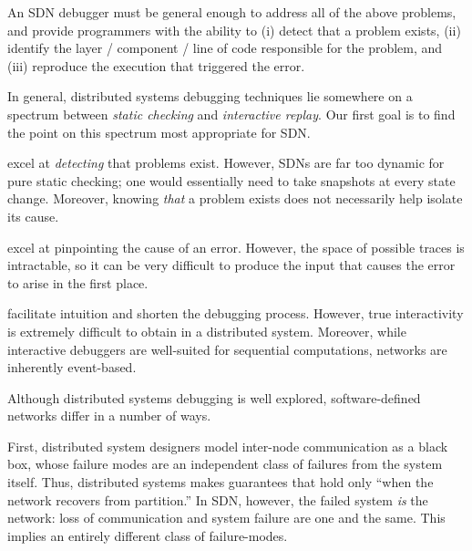 An SDN debugger must be general enough to address all of the above problems, and provide programmers
with the ability to (i) detect that a problem exists, (ii) identify the layer / component / line of code
responsible for the problem, and (iii) reproduce the execution that triggered the error.

In general, distributed systems debugging techniques lie somewhere on a spectrum between
{\it static checking} and {\it interactive replay}. Our first goal is to find
the point on this spectrum most appropriate for SDN. 

 \cite{anteater} excel at {\it detecting} that problems
exist. However, SDNs are far too dynamic for pure static checking; one would
essentially need to take snapshots at every state change. Moreover,
knowing {\it that} a problem exists does not necessarily help isolate its
cause.

 \cite{x-trace} excel at pinpointing the cause of an
error. However, the space of possible traces is intractable, so it can be very
difficult to produce the input that causes the error to arise in the first
place.

 facilitate intuition and shorten the
debugging process. However, true interactivity is extremely difficult to
obtain in a distributed system. 
Moreover, while interactive debuggers are
well-suited for sequential
computations, networks are inherently event-based.

Although distributed systems debugging is well explored,
software-defined networks differ in a number of ways.

         
First, distributed system designers model inter-node communication as a black box, whose failure modes are an independent class of failures from the system itself.
Thus, distributed systems makes guarantees that hold only ``when the network recovers from partition.''
In SDN, however, the failed system {\it is} the network: loss of
communication and system failure are one and the same. This implies an
entirely different class of failure-modes.

